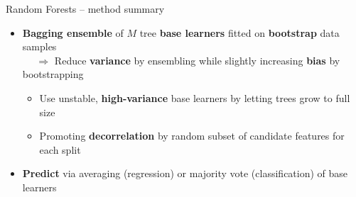 \begin{frame2}{Random Forests -- method summary}

 
  


\begin{itemize}
  \item \textbf{Bagging ensemble} of $M$ tree \textbf{base learners} fitted on \textbf{bootstrap} data samples\\
   ~~ $\Rightarrow$ Reduce \textbf{variance} by ensembling while slightly increasing \textbf{bias} by bootstrapping  
   \begin{itemize}
    \item Use unstable, \textbf{high-variance} base learners by letting trees grow to full size
    \item Promoting \textbf{decorrelation} by random subset of candidate features for each split
  \end{itemize}
  \item \textbf{Predict} via averaging (regression) or majority vote (classification) of base learners
\end{itemize}

\medskip
{}
\end{frame2}

